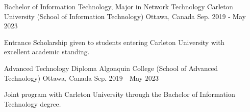 

\begin{cventries}

  \cventry
    {Bachelor of Information Technology, Major in Network Technology} %
    {Carleton University (School of Information Technology)} %
    {Ottawa, Canada} %
    {Sep. 2019 - May 2023} %
    {
      \begin{cvitems} %
        \item {Entrance Scholarship given to students entering Carleton University with excellent academic standing.}
      \end{cvitems}
    }

  \cventry
    {Advanced Technology Diploma} %
    {Algonquin College (School of Advanced Technology)} %
    {Ottawa, Canada} %
    {Sep. 2019 - May 2023} %
    {
      \begin{cvitems} %
        \item {Joint program with Carleton University through the Bachelor of Information Technology degree.}
      \end{cvitems}
    }
\end{cventries}
